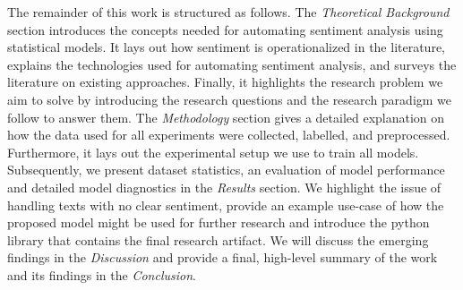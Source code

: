 The remainder of this work is structured as follows. The \emph{Theoretical Background} section introduces the concepts needed for automating sentiment analysis using statistical models. It lays out how sentiment is operationalized in the literature, explains the technologies used for automating sentiment analysis, and surveys the literature on existing approaches. Finally, it highlights the research problem we aim to solve by introducing the research questions and the research paradigm we follow to answer them. The \emph{Methodology} section gives a detailed explanation on how the data used for all experiments were collected, labelled, and preprocessed. Furthermore, it lays out the experimental setup we use to train all models. Subsequently, we present dataset statistics, an evaluation of model performance and detailed model diagnostics in the \emph{Results} section. We highlight the issue of handling texts with no clear sentiment, provide an example use-case of how the proposed model might be used for further research and introduce the python library that contains the final research artifact. We will discuss the emerging findings in the \emph{Discussion} and provide a final, high-level summary of the work and its findings in the \emph{Conclusion}.